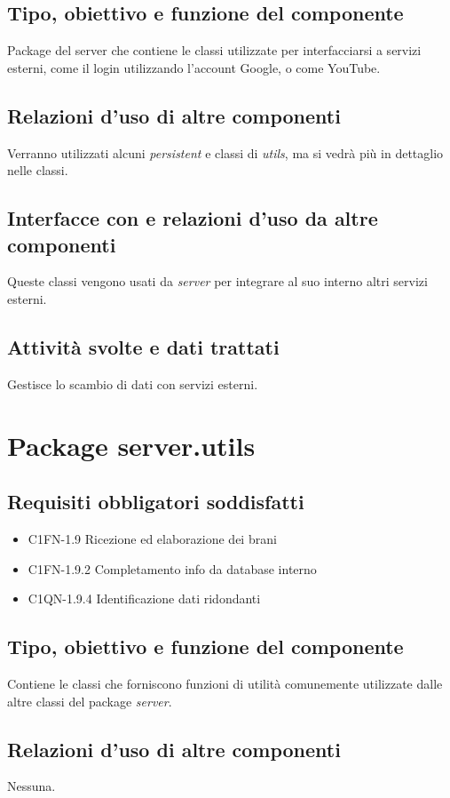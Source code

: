 \subsection*{Tipo, obiettivo e funzione del componente}
Package del server che contiene le classi utilizzate per interfacciarsi a
servizi esterni, come il login utilizzando l'account Google, o come YouTube.

\subsection*{Relazioni d'uso di altre componenti}
Verranno utilizzati alcuni \emph{persistent} e classi di \emph{utils}, ma
si vedr\`a pi\`u in dettaglio nelle classi.

\subsection*{Interfacce con e relazioni d'uso da altre componenti}
Queste classi vengono usati da \emph{server} per integrare al suo interno
altri servizi esterni.
\subsection*{Attivit\`a svolte e dati trattati}
Gestisce lo scambio di dati con servizi esterni.

\newpage
\section{Package server.utils} %
\subsection*{Requisiti obbligatori soddisfatti}
\begin{itemize}
	\item C1FN-1.9 Ricezione ed elaborazione dei brani
	\item C1FN-1.9.2 Completamento info da database interno
	\item C1QN-1.9.4 Identificazione dati ridondanti
\end{itemize}
\subsection*{Tipo, obiettivo e funzione del componente}
Contiene le classi che forniscono funzioni di utilit\`a comunemente utilizzate
dalle altre classi del package \emph{server}.
\subsection*{Relazioni d'uso di altre componenti}
Nessuna.
